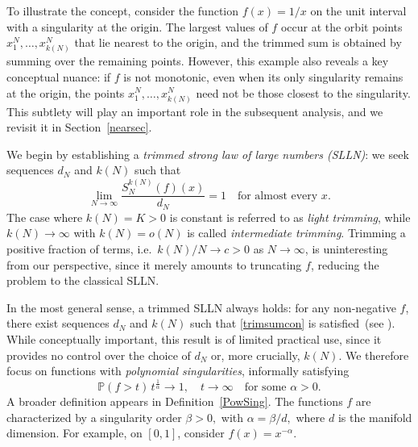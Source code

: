 \documentclass[11pt,twoside,a4paper,reqno]{amsart}
\renewcommand{\P}{\mathbb{P}}
\begin{document}
To illustrate the concept, consider the function $f(x)=1/x$ on the unit interval with a singularity at the origin. The largest values of $f$ occur at the orbit points $x_1^N,\dots,x_{k(N)}^N$ that lie nearest to the origin, and the trimmed sum is obtained by summing over the remaining points. However, this example also reveals a key conceptual nuance: if $f$ is not monotonic, even when its only singularity remains at the origin, the points $x_1^N,\dots,x_{k(N)}^N$ need not be those closest to the singularity. This subtlety will play an important role in the subsequent analysis, and we revisit it in Section~\ref{nearsec}.



We begin by establishing a \emph{trimmed strong law of large numbers (SLLN)}: we seek sequences $d_N$ and $k(N)$ such that
\begin{equation}\label{trimsumcon}
\lim_{N\to\infty} \frac{S_N^{k(N)}(f)(x)}{d_N}=1
\quad \text{for almost every } x.
\end{equation}
The case where $k(N)=K>0$ is constant is referred to as \emph{light trimming}, while $k(N) \to \infty$ with $k(N) = o(N)$ is called \emph{intermediate trimming}. Trimming a positive fraction of terms, i.e.\ $k(N)/N \to c>0$ as $N \to \infty$, is uninteresting from our perspective, since it merely amounts to truncating $f$, reducing the problem to the classical SLLN.



In the most general sense, a trimmed SLLN always holds: for any non-negative $f$, there exist sequences $d_N$ and $k(N)$ such that \eqref{trimsumcon} is satisfied~(see \cite{AS25}). While conceptually important, this result is of limited practical use, since it provides no control over the choice of $d_N$ or, more crucially, $k(N)$. We therefore focus on functions with \emph{polynomial singularities}, informally satisfying
\begin{equation}\label{tlno}
\P(f>t)\,t^{\frac{1}{\alpha}}\to 1,\quad t\to\infty\quad \text{for some } \alpha >0.
\end{equation}
A broader definition appears in Definition~\ref{PowSing}. The functions $f$ are characterized by a singularity order $\beta>0,$ with $\alpha = \beta/d,$ where $d$ is the manifold dimension. For example, on $[0,1]$, consider $f(x) = x^{-\alpha}.$
\end{document}
